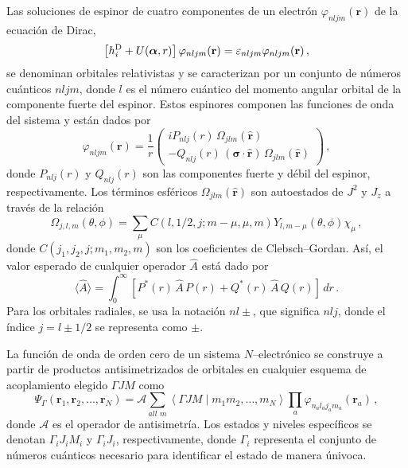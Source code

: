 Las soluciones de espinor de cuatro componentes de un electrón 
$\varphi_{nljm}(\mathbf{r})$ de la ecuación de Dirac,
\begin{equation}
\left[ h_i^{\mbox{\scriptsize D}} +U(\boldsymbol{\alpha},r) \right] 
\varphi_{nljm}(\mathbf{r}) 
= \varepsilon_{nljm} \varphi_{nljm}(\mathbf{r})\,,
\label{eq:ecuacionDirac}
\end{equation}
se denominan orbitales relativistas y se caracterizan por un conjunto de 
números cuánticos $nljm$, donde $l$ es el número cuántico del momento 
angular orbital de la componente fuerte del espinor. 
%
Estos espinores componen las funciones de onda del sistema y están 
dados por 
\begin{equation}
\varphi_{nljm}(\mathbf{r}) = \frac{1}{r} \left( 
\begin{array}{c}
i P_{nlj}(r) \,\Omega_{jlm}(\hat{\mathbf{r}}) \\ 
- Q_{nlj}(r) \,(\boldsymbol{\sigma}\cdot\hat{\mathbf{r}})\,
\Omega_{jlm}(\hat{\mathbf{r}})
\end{array}
\right)\,,
\label{eq:sepespinor}
\end{equation}
donde $P_{nlj}(r)$ y $Q_{nlj}(r)$ son las componentes fuerte y débil del
espinor, respectivamente. Los términos esféricos 
$\Omega_{jlm}(\hat{\mathbf{r}})$ son autoestados de $J^2$ y $J_z$ a 
través de la relación
\begin{equation}
\Omega_{j,l,m}(\theta,\phi)=\sum_{\mu} C(l,1/2,j;m-\mu,\mu,m) 
Y_{l,m-\mu}(\theta,\phi)\chi_{\mu}\,,
\end{equation}
donde $C\left(j_1,j_2,j;m_1,m_2,m\right)$ son los coeficientes de 
Clebsch--Gordan. Así, el valor esperado de cualquier operador $\hat{A}$ 
está dado por
\begin{equation}
\langle\hat{A}\rangle=\int_0^{\infty}\left[P^*(r)\,\hat{A}\,P(r) 
 +Q^*(r)\,\hat{A}\,Q(r)
\right]\,dr\,.
\label{eq:meanvalr}
\end{equation}
Para los orbitales radiales, se usa la notación $nl\pm$, que significa 
$nlj$, donde el índice $j=l\pm1/2$ se representa como $\pm$.

La función de onda de orden cero de un sistema $N$--electrónico se 
construye a partir de productos antisimetrizados de orbitales en 
cualquier esquema de acoplamiento elegido $\Gamma JM$ como 
\begin{equation}
\Psi_{\Gamma}\left(\mathbf{r}_1,\mathbf{r}_2,\ldots,\mathbf{r}_N\right)
=\mathcal{A}\sum_{all\,\,m}\left\langle\Gamma JM\mid m_1 m_2,\ldots,m_{N}\right
\rangle \prod_{a} \varphi_{n_a l_a j_a m_a}\left(\mathbf{r}_a\right)\,,
\end{equation}
donde $\mathcal{A}$ es el operador de antisimetría. Los estados y niveles 
específicos se denotan $\Gamma_iJ_iM_i$ y $\Gamma_iJ_i$, respectivamente,
donde $\Gamma_i$ representa el conjunto de números cuánticos necesario 
para identificar el estado de manera únivoca. 


